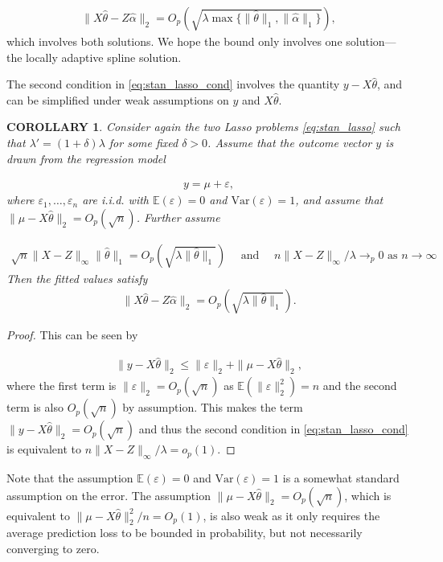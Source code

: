 \documentclass[a4paper]{article}
\newtheorem{corollary}{COROLLARY}
\newcommand{\E}{\mathbb{E}}
\begin{document}
\begin{align*}
\|X\hat{\theta} - Z\hat{\alpha}\|_2 = O_p(\sqrt{\lambda\max\{\|\hat{\theta}\|_1, \|\hat{\alpha}\|_1\}}),
\end{align*}
which involves both solutions. We hope the bound only involves one solution---the locally adaptive spline solution.

The second condition in \eqref{eq:stan_lasso_cond} involves the quantity $y-X\hat{\theta}$, and can be simplified under weak assumptions on $y$ and $X\hat{\theta}$. 

\begin{corollary}
Consider again the two Lasso problems \eqref{eq:stan_lasso} such that $\lambda' = (1+\delta)\lambda$ for some fixed $\delta > 0$. Assume that the outcome vector $y$ is drawn from the regression model 

\begin{align*}
y = \mu + \varepsilon,
\end{align*}
where $\varepsilon_1,\ldots,\varepsilon_n$ are i.i.d. with $\E(\varepsilon) = 0$ and $\mbox{Var}(\varepsilon) = 1$, and assume that $\|\mu-X\hat{\theta}\|_2 = O_p(\sqrt{n})$. Further assume 

\begin{align*}
\sqrt{n}\|X-Z\|_\infty\|\hat{\theta}\|_1 = O_p(\sqrt{\lambda\|\hat{\theta}\|_1}) \quad \text{ and } \quad n\|X-Z\|_\infty/\lambda \rightarrow_p 0 \text{ as } n\rightarrow \infty
\end{align*}
Then the fitted values satisfy
\begin{align*}
\|X\hat{\theta} - Z\hat{\alpha}\|_2 = O_p(\sqrt{\lambda\|\hat{\theta}\|_1}).
\end{align*}
\label{cor:corollary_1}
\end{corollary}
\begin{proof}
This can be seen by 

\begin{align*}
\|y-X\hat{\theta}\|_2 \leq \|\varepsilon\|_2 + \|\mu - X\hat{\theta}\|_2,
\end{align*}
where the first term is $\|\varepsilon\|_2 = O_p(\sqrt{n})$ as $\E(\|\varepsilon\|_2^2) = n$ and the second term is also $O_p(\sqrt{n})$ by assumption. This makes the term $\|y-X\hat{\theta}\|_2 = O_p(\sqrt{n})$ and thus the second condition in \eqref{eq:stan_lasso_cond} is equivalent to $n\|X-Z\|_\infty/\lambda = o_p(1)$. 
\end{proof}

Note that the assumption $\E(\varepsilon) = 0$ and $\mbox{Var}(\varepsilon) = 1$ is a somewhat standard assumption on the error. The assumption $\|\mu - X\hat{\theta}\|_2 = O_p(\sqrt{n})$, which is equivalent to $\|\mu-X\hat{\theta}\|_2^2/n = O_p(1)$, is also weak as it only requires the average prediction loss to be bounded in probability, but not necessarily converging to zero.
\end{document}
